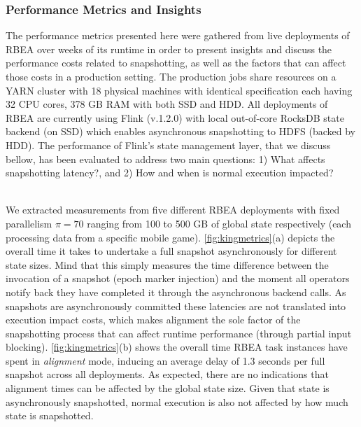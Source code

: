 \subsubsection{Performance Metrics and Insights} The performance metrics presented here were gathered from live deployments of RBEA over weeks of its runtime in order to present insights and discuss the performance costs related to snapshotting, as well as the factors that can affect those costs in a production setting. The production jobs share resources on a YARN cluster with 18 physical machines with identical specification each having 32 CPU cores, 378 GB RAM with both SSD and HDD. All deployments of RBEA are currently using Flink (v.1.2.0) with local out-of-core RocksDB state backend (on SSD) which enables asynchronous snapshotting to HDFS (backed by HDD). The performance of Flink's state management layer, that we discuss bellow,  has been evaluated to address two main questions: 1) What affects  snapshotting latency?, and 2) How and when is normal execution impacted?
\vspace*{-1mm}

 \\
We extracted measurements from five different RBEA deployments with fixed parallelism $\pi = 70$ ranging from 100 to 500 GB of global state respectively (each processing data from a specific mobile game). \autoref{fig:kingmetrics}(a) depicts the overall time it takes to undertake a full snapshot asynchronously for different state sizes. Mind that this simply measures the time difference between the invocation of a snapshot (epoch marker injection) and the moment all operators notify back they have completed it through the asynchronous backend calls. As snapshots are asynchronously committed these latencies are not translated into execution impact costs, which makes alignment the sole factor of the snapshotting process that can affect runtime performance (through partial input blocking). \autoref{fig:kingmetrics}(b) shows the overall time RBEA task instances have spent in \emph{alignment} mode, inducing an average delay of 1.3 seconds per full snapshot across all deployments. As expected, there are no indications that alignment times can be affected by the global state size. Given that state is asynchronously snapshotted, normal execution is also not affected by how much state is snapshotted.
\vspace*{-1mm}

